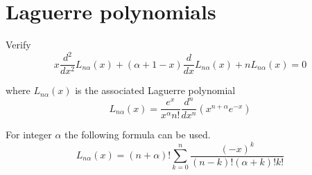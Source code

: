 

\section*{Laguerre polynomials}

Verify
\begin{equation*}
x\frac{d^2}{dx^2}L_{n\alpha}(x)+(\alpha+1-x)\frac{d}{dx}L_{n\alpha}(x)+nL_{n\alpha}(x)=0
\end{equation*}

where $L_{n\alpha}(x)$ is the associated Laguerre polynomial
\begin{equation*}
L_{n\alpha}(x)=\frac{e^x}{x^\alpha n!}\frac{d^n}{dx^n}(x^{n+\alpha}e^{-x})
\end{equation*}

For integer $\alpha$ the following formula can be used.
\begin{equation*}
L_{n\alpha}(x)=(n+\alpha)!\sum_{k=0}^n\frac{(-x)^k}{(n-k)!(\alpha+k)!k!}
\end{equation*}



